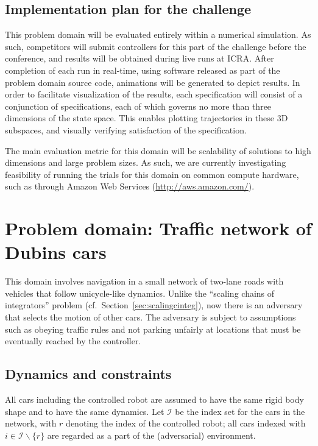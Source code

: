 \documentclass{amsart}
\theoremstyle{definition}
\begin{document}
\subsection{Implementation plan for the challenge}

This problem domain will be evaluated entirely within a numerical simulation.
As such, competitors will submit controllers for this part of the challenge
before the conference, and results will be obtained during live runs at ICRA.
After completion of each run in real-time, using software released as part of
the problem domain source code, animations will be generated to depict results.
In order to facilitate visualization of the results, each specification will consist 
of a conjunction of specifications, each of which governs no more than three 
dimensions of the state space. This enables plotting trajectories in these 3D 
subspaces, and visually verifying satisfaction of the specification. 

The main evaluation metric for this domain will be scalability of solutions to
high dimensions and large problem sizes. As such, we are currently investigating
feasibility of running the trials for this domain on common compute hardware,
such as through Amazon Web Services (\url{http://aws.amazon.com/}).


\section{Problem domain: Traffic network of Dubins cars}\label{sec:trafficdubins}

This domain involves navigation in a small network of two-lane roads with
vehicles that follow unicycle-like dynamics. Unlike the ``scaling
chains of integrators'' problem (cf.\ Section~\ref{sec:scalingcinteg}), now
there is an adversary that selects the motion of other cars.  The adversary is
subject to assumptions such as obeying traffic rules and not parking unfairly at
locations that must be eventually reached by the controller.

\subsection{Dynamics and constraints}
All cars including the controlled robot are assumed to have the same rigid body
shape and to have the same dynamics. Let $\mathcal I$ be the index set for the
cars in the network, with $r$ denoting the index of the controlled robot; all
cars indexed with $i \in {\mathcal I}\backslash\{r\}$ are regarded as a part of
the (adversarial) environment.
\end{document}
